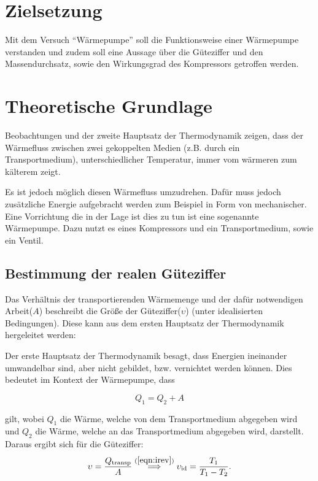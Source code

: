 \section{Zielsetzung}
    Mit dem Versuch "`Wärmepumpe"' soll die Funktionsweise einer Wärmepumpe verstanden und zudem soll eine Aussage über die Güteziffer und den Massendurchsatz,
    sowie den Wirkungsgrad des Kompressors getroffen werden.

    \section{Theoretische Grundlage}
    Beobachtungen und der zweite Hauptsatz der Thermodynamik zeigen, dass der Wärmefluss zwischen zwei gekoppelten Medien (z.B. durch ein Transportmedium), unterschiedlicher Temperatur, immer vom wärmeren zum kälterem zeigt.

    Es ist jedoch möglich diesen Wärmefluss umzudrehen. Dafür muss jedoch zusätzliche Energie aufgebracht werden zum Beispiel in Form von mechanischer. Eine Vorrichtung die in der Lage ist dies zu tun ist 
    eine sogenannte Wärmepumpe. Dazu nutzt es eines Kompressors und ein Transportmedium, sowie ein Ventil. 

        \subsection{Bestimmung der realen Güteziffer}
    	Das Verhältnis der transportierenden Wärmemenge und der dafür notwendigen Arbeit($A$) beschreibt die Größe der Güteziffer($\upsilon$) (unter idealisierten Bedingungen).
        Diese kann aus dem ersten Hauptsatz der Thermodynamik hergeleitet werden:

        Der erste Hauptsatz der Thermodynamik besagt, dass Energien ineinander umwandelbar sind, aber nicht gebildet, bzw. vernichtet werden können. 
        Dies bedeutet im Kontext der Wärmepumpe, dass

        \begin{equation}
            Q_1 = Q_2 + A
            \label{eqn:Th1}
        \end{equation}

        gilt, wobei $Q_1$ die Wärme, welche von dem Transportmedium abgegeben wird und $Q_2$ die Wärme, welche an das Transportmedium abgegeben wird, darstellt. Daraus ergibt sich für die Güteziffer:
        \begin{equation}
            \upsilon = \frac{Q_\text{transp}}{A} \stackrel{(\ref{eqn:irev})}{\implies} \upsilon_\text{id} = \frac{T_1}{T_1 - T_2}.
            \label{eqn:Gueteziffer}
        \end{equation}

